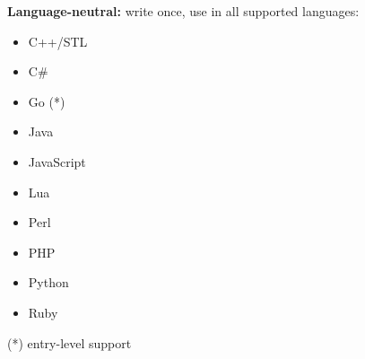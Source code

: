 \documentclass[a0paper,portrait]{baposter}
\begin{document}
\begin{poster}
{\begin{multicols}{2}
    \begin{minipage}{0.40\textwidth}
      \begin{flushleft}
        \textbf{Language-neutral:} write once, use in all supported languages:	
				
				\begin{multicols}{2}
				  \begin{minipage}{0.5\textwidth}
						\begin{itemize}[noitemsep]
							\item C++/STL
							\item C\#
							\item Go (*)
							\item Java
							\item JavaScript
						\end{itemize}
				  \end{minipage}
					
				  \begin{minipage}{0.5\textwidth}
						\begin{itemize}[noitemsep]
							\item Lua
							\item Perl
							\item PHP
							\item Python
							\item Ruby
						\end{itemize}
				  \end{minipage}
        \end{multicols}
				\vspace{0.1cm}
				\scriptsize{(*) entry-level support}
				\vspace{0.1cm}
      \end{flushleft}      
    \end{minipage}
  \end{multicols}
\vspace{0.1cm}
}


\end{poster}
\end{document}
